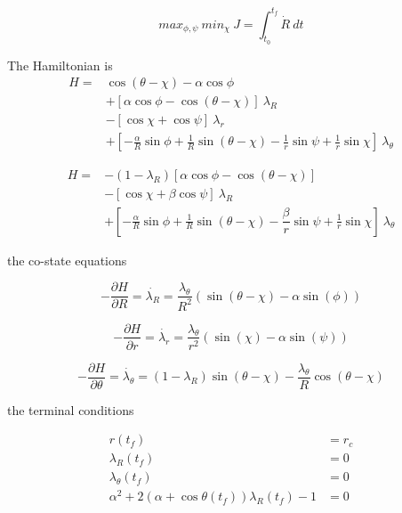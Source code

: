 \begin{equation*}
max_{\phi,\psi}\ min_\chi\ J= \int_{t_0}^{t_f} \dot{R}\ dt
\end{equation*}

The Hamiltonian is
\begin{equation}
	\begin{split}
	H = & \cos(\theta - \chi) - \alpha \cos \phi \\
	& + [\alpha \cos \phi  - \cos (\theta - \chi)]\ \lambda_R \\
	& - [\cos\chi + \cos\psi]\ \lambda_r \\
	& + [-\frac{\alpha}{R}\sin\phi 
	+\frac{1}{R}\sin(\theta - \chi )
	-\frac{1}{r} \sin \psi
	+\frac{1}{r} \sin \chi]\ \lambda_\theta
	\end{split}
	\label{Hamiltonian}
\end{equation}


\begin{equation*}
	\begin{split}
		H = & -(1-\lambda_R) [\alpha \cos \phi - \cos(\theta - \chi)]\\
		& - [\cos\chi + \beta \cos \psi ]\ \lambda_R \\
		& + [-\frac{\alpha}{R} \sin \phi + \frac{1}{R} \sin (\theta - \chi) - \dfrac{\beta}{r} \sin \psi + \frac{1}{r} \sin \chi ]\ \lambda_\theta 
	\end{split}
\end{equation*}

the co-state equations

\begin{equation}
	-\frac{\partial H}{\partial R} = \dot{\lambda_R}=\frac{\lambda_\theta}{R^2} (\sin(\theta - \chi) -\alpha \sin(\phi) )
\label{lambda R dot}
\end{equation}


\begin{equation}
-\frac{\partial H}{\partial r} = \dot{\lambda_r}=\frac{\lambda_\theta}{r^2} (\sin(\chi) -\alpha \sin(\psi) )
\label{lambda r dot}
\end{equation}

\begin{equation}
-\frac{\partial H}{\partial \theta} = \dot{\lambda_\theta}=(1- \lambda_R) \sin(\theta - \chi) - \frac{\lambda_\theta}{R} \cos(\theta - \chi)
\label{lambda theta dot}
\end{equation}


the terminal conditions 

\begin{equation}
\begin{split}
	r(t_f)&=r_c\\
\lambda_R(t_f)&=0\\
\lambda_\theta(t_f)&=0\\
\alpha^2 + 2(\alpha + \cos\theta(t_f)) \lambda_R(t_f)-1&=0
\end{split}
\label{terminal conditions}
\end{equation}



